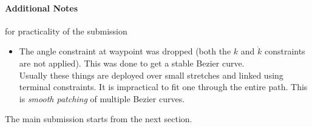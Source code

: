 \paragraph{Additional Notes} for practicality of the submission

\begin{itemize}
    \item The angle constraint at waypoint was dropped (both the $k$ and $\dot{k}$ constraints are not applied). This was done to get a stable Bezier curve. 
    \\
    Usually these things are deployed over small stretches and linked using terminal constraints. It is impractical to fit one through the entire path. This is \emph{smooth patching} of multiple Bezier curves.
\end{itemize}

The main submission starts from the next section.
